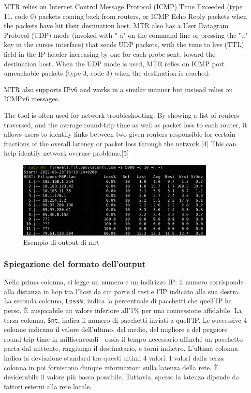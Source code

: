 MTR relies on Internet Control Message Protocol (ICMP) Time Exceeded (type 11, code 0) packets coming back from routers, or ICMP Echo Reply packets when the packets have hit their destination host. MTR also has a User Datagram Protocol (UDP) mode (invoked with "-u" on the command line or pressing the "u" key in the curses interface) that sends UDP packets, with the time to live (TTL) field in the IP header increasing by one for each probe sent, toward the destination host. When the UDP mode is used, MTR relies on ICMP port unreachable packets (type 3, code 3) when the destination is reached.

MTR also supports IPv6 and works in a similar manner but instead relies on ICMPv6 messages.

The tool is often used for network troubleshooting. By showing a list of routers traversed, and the average round-trip time as well as packet loss to each router, it allows users to identify links between two given routers responsible for certain fractions of the overall latency or packet loss through the network.[4] This can help identify network overuse problems.[5]

\begin{figure}[ht]
    \centering
    \includegraphics[width=10cm]{figure/mtrSample.png}
    \caption{Esempio di output di mrt}
\end{figure}

\subsubsection{Spiegazione del formato dell'output}
Nella prima colonna, si legge un numero e un indirizzo IP: il numero corrisponde alla distanza in hop tra l'host da cui parte il test e l'IP indicato alla sua destra.
La seconda colonna, \texttt{Loss\%}, indica la percentuale di pacchetti che quell'IP ha perso. È auspicabile un valore inferiore all'1\% per una connessione affidabile.
La terza colonna, \texttt{Snt}, indica il numero di pacchetti inviati a quell'IP.
Le successive 4 colonne indicano il valore dell'ultimo, del medio, del migliore e del peggiore round-trip-time in millisencondi - ossia il tempo necessario affinché un pacchetto parta dal mittente, raggiunga il destinatario, e torni indietro.
L'ultima colonna indica la deviazione standard tra questi ultimi 4 valori.
I valori dalla terza colonna in poi forniscono dunque informazioni sulla latenza della rete. È desiderabile il valore più basso possibile. Tuttavia,  spesso la latenza dipende da fattori esterni alla rete locale.

